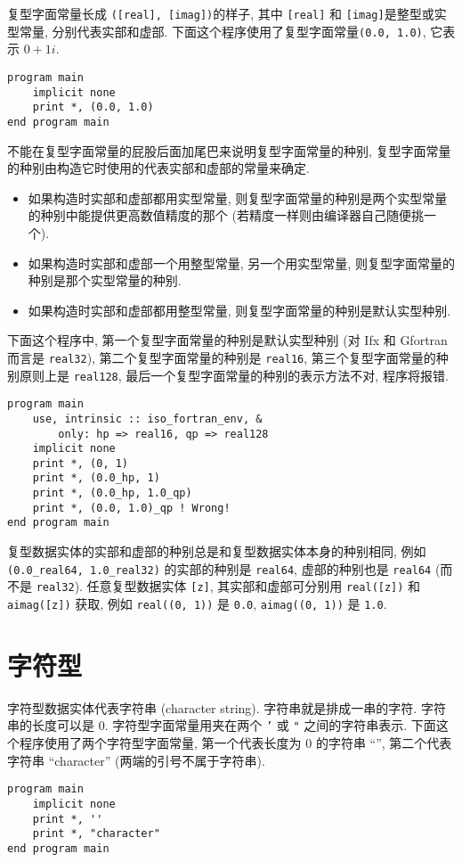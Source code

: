 复型字面常量长成 \texttt{([real], [imag])}的样子, 其中 \texttt{[real]} 和 \texttt{[imag]}是整型或实型常量, 分别代表实部和虚部. 下面这个程序使用了复型字面常量\texttt{(0.0, 1.0)}, 它表示 $0+1i$.
\begin{lstlisting}
program main
    implicit none
    print *, (0.0, 1.0)
end program main
\end{lstlisting}

不能在复型字面常量的屁股后面加尾巴来说明复型字面常量的种别, 复型字面常量的种别由构造它时使用的代表实部和虚部的常量来确定.
\begin{itemize}
    \item 如果构造时实部和虚部都用实型常量, 则复型字面常量的种别是两个实型常量的种别中能提供更高数值精度的那个 (若精度一样则由编译器自己随便挑一个).
    \item 如果构造时实部和虚部一个用整型常量, 另一个用实型常量, 则复型字面常量的种别是那个实型常量的种别.
    \item 如果构造时实部和虚部都用整型常量, 则复型字面常量的种别是默认实型种别.
\end{itemize}
下面这个程序中, 第一个复型字面常量的种别是默认实型种别 (对 Ifx 和 Gfortran 而言是 \texttt{real32}), 第二个复型字面常量的种别是 \texttt{real16}, 第三个复型字面常量的种别原则上是 \texttt{real128}, 最后一个复型字面常量的种别的表示方法不对, 程序将报错.
\begin{lstlisting}
program main
    use, intrinsic :: iso_fortran_env, &
        only: hp => real16, qp => real128
    implicit none
    print *, (0, 1)
    print *, (0.0_hp, 1)
    print *, (0.0_hp, 1.0_qp)
    print *, (0.0, 1.0)_qp ! Wrong!
end program main
\end{lstlisting}

复型数据实体的实部和虚部的种别总是和复型数据实体本身的种别相同, 例如 \texttt{(0.0\_{}real64, 1.0\_{}real32)} 的实部的种别是 \texttt{real64}, 虚部的种别也是 \texttt{real64} (而不是 \texttt{real32}). 任意复型数据实体 \texttt{[z]}, 其实部和虚部可分别用 \texttt{real([z])} 和 \texttt{aimag([z])} 获取, 例如 \texttt{real((0, 1))} 是 \texttt{0.0}, \texttt{aimag((0, 1))} 是 \texttt{1.0}.

\section{字符型}\label{fortran_char}

字符型数据实体代表字符串 (character string). 字符串就是排成一串的字符. 字符串的长度可以是 $0$. 字符型字面常量用夹在两个 \texttt{'} 或 \texttt{"} 之间的字符串表示. 下面这个程序使用了两个字符型字面常量, 第一个代表长度为 $0$ 的字符串 ``'', 第二个代表字符串 ``character'' (两端的引号不属于字符串).
\begin{lstlisting}
program main
    implicit none
    print *, ''
    print *, "character"
end program main
\end{lstlisting}

